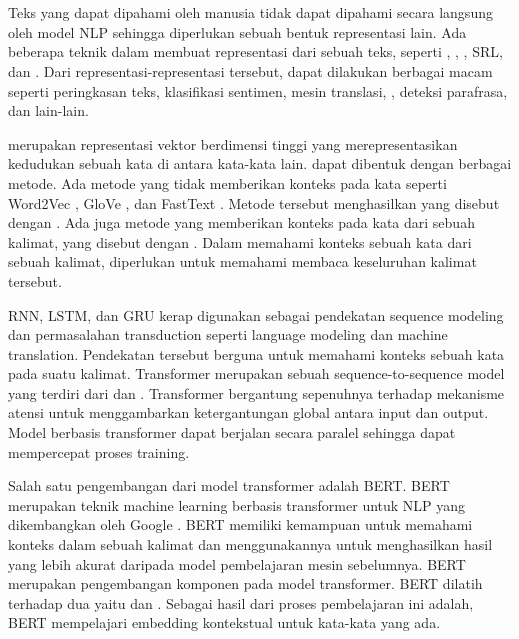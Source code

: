\section{}

Teks yang dapat dipahami oleh manusia tidak dapat dipahami secara langsung oleh model \gls{NLP} sehingga diperlukan sebuah bentuk representasi lain.
Ada beberapa teknik dalam membuat representasi dari sebuah teks, seperti , , \wordem{}, \gls{SRL}, dan \AMR{}.
Dari representasi-representasi tersebut, dapat dilakukan berbagai macam  seperti peringkasan teks, klasifikasi sentimen, mesin translasi, , deteksi parafrasa, dan lain-lain.

\Wordem{} merupakan representasi vektor berdimensi tinggi yang merepresentasikan kedudukan sebuah kata di antara kata-kata lain.
\Wordem{} dapat dibentuk dengan berbagai metode.
Ada metode yang tidak memberikan konteks pada kata seperti Word2Vec , GloVe , dan FastText .
Metode tersebut menghasilkan yang disebut dengan  \wordem{}.
Ada juga metode yang memberikan konteks pada kata dari sebuah kalimat, yang disebut dengan  \wordem{}.
Dalam memahami konteks sebuah kata dari sebuah kalimat, diperlukan untuk memahami membaca keseluruhan kalimat tersebut.

\Gls{RNN}, \gls{LSTM}, dan \gls{GRU} kerap digunakan sebagai pendekatan sequence modeling dan permasalahan transduction seperti language modeling dan machine translation.
Pendekatan tersebut berguna untuk memahami konteks sebuah kata pada suatu kalimat.
Transformer merupakan sebuah sequence-to-sequence model yang terdiri dari  dan  .
Transformer bergantung sepenuhnya terhadap mekanisme atensi untuk menggambarkan ketergantungan global antara input dan output.
Model berbasis transformer dapat berjalan secara paralel sehingga dapat mempercepat proses training.

Salah satu pengembangan  dari model transformer adalah \gls{BERT}.
\gls{BERT} merupakan teknik machine learning berbasis transformer untuk \gls{NLP} yang dikembangkan oleh Google .
\gls{BERT} memiliki kemampuan untuk memahami konteks dalam sebuah kalimat dan menggunakannya untuk menghasilkan hasil yang lebih akurat daripada model pembelajaran mesin sebelumnya.
\gls{BERT} merupakan pengembangan komponen  pada model transformer.
\gls{BERT} dilatih terhadap dua  yaitu  dan .
Sebagai hasil dari proses pembelajaran ini adalah, \gls{BERT} mempelajari embedding kontekstual untuk kata-kata yang ada.

